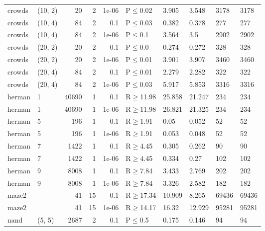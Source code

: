 \begin{longtable}{llrrrlllll}
 crowds        & (10, 2)   &     	20 &   2 & 1e-06 & P$\leq$0.02  & 3.905   & 3.548   & 3178   & 3178   \\
 crowds        & (10, 4)   &     	84 &   2 & 0.1   & P$\leq$0.03  & 0.382   & 0.378   & 277    & 277    \\
 crowds        & (10, 4)   &     	84 &   2 & 1e-06 & P$\leq$0.1   & 3.564   & 3.5     & 2902   & 2902   \\
 crowds        & (20, 2)   &     	20 &   2 & 0.1   & P$\leq$0.0   & 0.274   & 0.272   & 328    & 328    \\
 crowds        & (20, 2)   &     	20 &   2 & 1e-06 & P$\leq$0.01  & 3.901   & 3.907   & 3460   & 3460   \\
 crowds        & (20, 4)   &     	84 &   2 & 0.1   & P$\leq$0.01  & 2.279   & 2.282   & 322    & 322    \\
 crowds        & (20, 4)   &     	84 &   2 & 1e-06 & P$\leq$0.03  & 5.917   & 5.853   & 3316   & 3316   \\
 herman        & 1         &  	40690 &   1 & 0.1   & R$\geq$11.98 & 25.858  & 21.247  & 234    & 234    \\
 herman        & 1         &  	40690 &   1 & 1e-06 & R$\geq$11.98 & 26.821  & 21.325  & 234    & 234    \\
 herman        & 5         &    	196 &   1 & 0.1   & R$\geq$1.91  & 0.05    & 0.052   & 52     & 52     \\
 herman        & 5         &    	196 &   1 & 1e-06 & R$\geq$1.91  & 0.053   & 0.048   & 52     & 52     \\
 herman        & 7         &   	1422 &   1 & 0.1   & R$\geq$4.45  & 0.305   & 0.262   & 90     & 90     \\
 herman        & 7         &   	1422 &   1 & 1e-06 & R$\geq$4.45  & 0.334   & 0.27    & 102    & 102    \\
 herman        & 9         &   	8008 &   1 & 0.1   & R$\geq$7.84  & 3.433   & 2.769   & 202    & 202    \\
 herman        & 9         &   	8008 &   1 & 1e-06 & R$\geq$7.84  & 3.326   & 2.582   & 182    & 182    \\
 maze2         &           &     	41 &  15 & 0.1   & R$\geq$17.34 & 10.909  & 8.265   & 69436  & 69436  \\
 maze2         &           &     	41 &  15 & 1e-06 & R$\geq$14.17 & 16.32   & 12.929  & 95281  & 95281  \\
 nand          & (5, 5)    &   	2687 &   2 & 0.1   & P$\leq$0.5   & 0.175   & 0.146   & 94     & 94     \\

\end{longtable}
